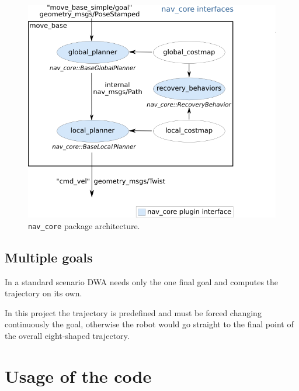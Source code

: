 \documentclass[11pt,a4paper]{article}
\begin{document}
\begin{figure}[H]
    \centering
    \includegraphics[scale=0.6]{other/nav_core.png}
    \caption{\texttt{nav\_core} package architecture.}
\end{figure}



\subsection{Multiple goals}

In a standard scenario DWA needs only the one final goal and computes the trajectory on its own.

In this project the trajectory is predefined and must be forced changing continuously the goal, otherwise
the robot would go straight to the final point of the overall eight-shaped trajectory.





\section{Usage of the code}
\end{document}
